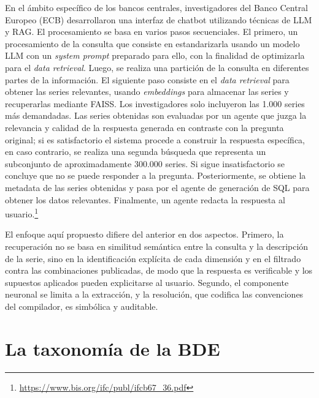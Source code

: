 \documentclass[11pt]{article}
\begin{document}
En el ámbito específico de los bancos centrales, investigadores del Banco Central
Europeo (ECB) desarrollaron una interfaz de chatbot utilizando técnicas de LLM y
RAG. El procesamiento se basa en varios pasos secuenciales. El primero, un
procesamiento de la consulta que consiste en estandarizarla usando un modelo LLM
con un \textit{system prompt} preparado para ello, con la finalidad de optimizarla
para el \textit{data retrieval}. Luego, se realiza una partición de la consulta en
diferentes partes de la información. El siguiente paso consiste en el
\textit{data retrieval} para obtener las series relevantes, usando
\textit{embeddings} para almacenar las series y recuperarlas mediante FAISS. Los
investigadores solo incluyeron las 1.000 series más demandadas. Las series
obtenidas son evaluadas por un agente que juzga la relevancia y calidad de la
respuesta generada en contraste con la pregunta original; si es satisfactorio el
sistema procede a construir la respuesta específica, en caso contrario, se realiza
una segunda búsqueda que representa un subconjunto de aproximadamente 300.000
series. Si sigue insatisfactorio se concluye que no se puede responder a la
pregunta. Posteriormente, se obtiene la metadata de las series obtenidas y pasa por
el agente de generación de SQL para obtener los datos relevantes. Finalmente, un
agente redacta la respuesta al usuario.\footnote{\url{https://www.bis.org/ifc/publ/ifcb67_36.pdf}}

El enfoque aquí propuesto difiere del anterior en dos aspectos. Primero, la
recuperación no se basa en similitud semántica entre la consulta y la descripción
de la serie, sino en la identificación explícita de cada dimensión y en el
filtrado contra las combinaciones publicadas, de modo que la respuesta es
verificable y los supuestos aplicados pueden explicitarse al usuario. Segundo, el
componente neuronal se limita a la extracción, y la resolución, que codifica las
convenciones del compilador, es simbólica y auditable.

\section{La taxonomía de la BDE}
\label{sec:taxonomia_bde}
\end{document}
